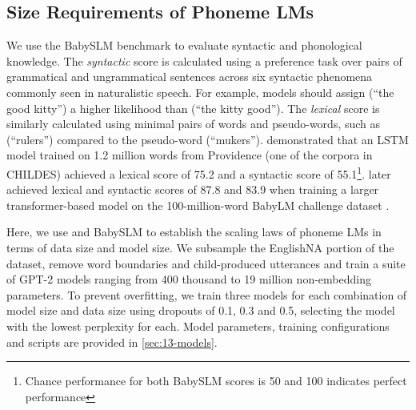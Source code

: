 \subsection{Size Requirements of Phoneme LMs}\label{sec:13-sizerequirements}




We use the BabySLM benchmark \citep{lavechin} to evaluate syntactic and phonological knowledge. The \emph{syntactic} score is calculated using a preference task over pairs of grammatical and ungrammatical sentences across six syntactic phenomena commonly seen in naturalistic speech. For example, models should assign  (``the good kitty'') a higher likelihood than  (``the kitty good''). The \emph{lexical} score is similarly calculated using minimal pairs of words and pseudo-words, such as  (``rulers'') compared to the pseudo-word  (``mukers''). \citet{lavechin} demonstrated that an LSTM model trained on 1.2 million words from Providence (one of the corpora in CHILDES) achieved a lexical score of 75.2 and a syntactic score of 55.1\footnote{Chance performance for both BabySLM scores is 50 and 100 indicates perfect performance}. \citet{goriely2024babble} later achieved lexical and syntactic scores of 87.8 and 83.9 when training a larger transformer-based model on the 100-million-word BabyLM challenge dataset \citep{conll-2024-babylm}.

Here, we use \ipachildes and BabySLM to establish the scaling laws of phoneme LMs in terms of data size and model size. We subsample the EnglishNA portion of the dataset, remove word boundaries and child-produced utterances and train a suite of GPT-2 models ranging from 400 thousand to 19 million non-embedding parameters. To prevent overfitting, we train three models for each combination of model size and data size using dropouts of 0.1, 0.3 and 0.5, selecting the model with the lowest perplexity for each. Model parameters, training configurations and scripts are provided in \cref{sec:13-models}.

